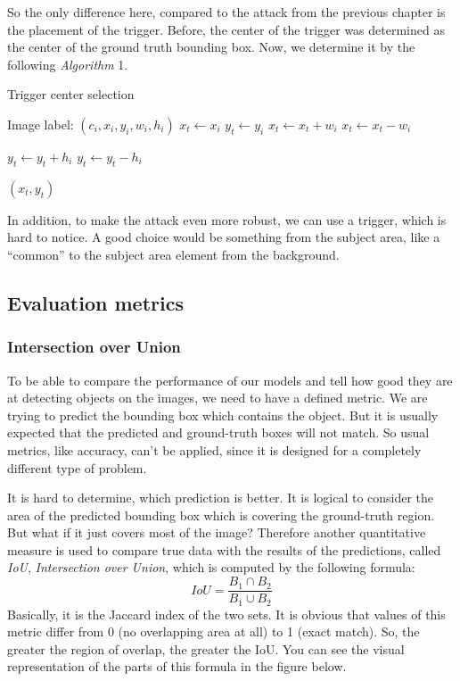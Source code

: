 \documentclass[14pt,a4paper]{extarticle}
\newcounter{e}
\newcounter{pic}
\numberwithin{equation}{section}
\numberwithin{figure}{section}
\begin{document}
So the only difference here, compared to the
attack from the previous chapter is the placement of the trigger. Before, the center of the trigger was determined as the center of the ground truth bounding box. Now, we determine it by the following \textit{Algorithm} 1.

\begin{algorithm}
\caption{Trigger center selection}\label{alg:cap}
\begin{algorithmic}
\Require Image label: $(c_i, x_i, y_i, w_i, h_i)$
\State $x_t \gets x_i$
\State $y_t \gets y_i$
    \State $x_t \gets x_t + w_i$
\Else
    \State $x_t \gets x_t - w_i$
\EndIf

    \State $y_t \gets y_t + h_i$
\Else
    \State $y_t \gets y_t - h_i$
\EndIf

\State \Return $(x_t, y_t)$
\end{algorithmic}
\end{algorithm}

In addition, to make the attack even more robust, we can use a trigger, which is hard to notice. A good choice would be something from the subject area, like a ``common'' to the subject area element from the background.


\subsection{Evaluation metrics}
\subsubsection{Intersection over Union}
To be able to compare the performance of our models and tell how good they are at detecting objects on the images, we need to have a defined metric.
We are trying to predict the bounding box which contains the object. But it is usually expected that the predicted and ground-truth boxes will not match. So usual metrics, like accuracy, can't be applied, since it is designed for a completely different type of problem.

It is hard to determine, which prediction is better. It is logical to consider the area of the predicted bounding box which is covering the ground-truth region. But what if it just covers most of the image? Therefore another quantitative measure is used to compare true data with the results of the predictions, called \textit{IoU}, \textit{Intersection over Union}, which is computed by the following formula:
\begin{equation}
    IoU = \frac{B_1 \cap B_2}{B_1 \cup B_2}
\end{equation}
Basically, it is the Jaccard index of the two sets.
It is obvious that values of this metric differ from 0 (no overlapping area at all) to 1 (exact match). So, the greater the region of overlap, the greater the IoU. You can see the visual representation of the parts of this formula in the figure below.
\end{document}
